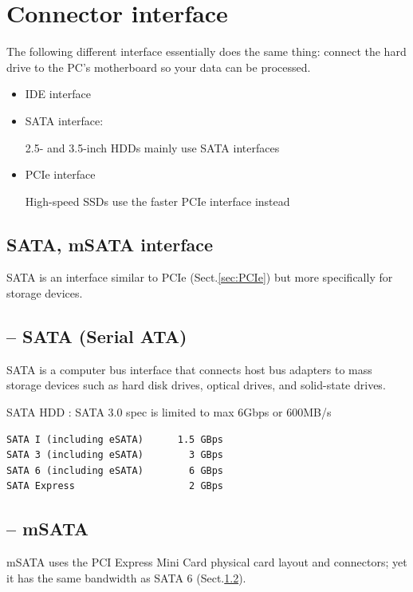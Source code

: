 \section{Connector interface}
\label{sec:connector-interface}

The following different interface essentially does the same thing: connect the
hard drive to the PC's motherboard so your data can be processed.

\begin{itemize}
  \item IDE interface
  
  \item SATA interface:
  
2.5- and 3.5-inch HDDs mainly use SATA interfaces  

    
  \item PCIe interface
  
High-speed SSDs use the faster PCIe interface instead
\end{itemize}


\subsection{SATA, mSATA interface}


SATA is an interface similar to PCIe (Sect.\ref{sec:PCIe}) but more specifically
for storage devices.


\subsection{-- SATA (Serial ATA)}
\label{sec:SATA}

SATA is a computer bus interface that connects host bus adapters to mass storage
devices such as hard disk drives, optical drives, and solid-state drives.

SATA HDD : SATA 3.0 spec is limited to max 6Gbps or  600MB/s

\begin{verbatim}
SATA I (including eSATA)      1.5 GBps
SATA 3 (including eSATA)        3 GBps
SATA 6 (including eSATA)        6 GBps
SATA Express	                2 GBps 
\end{verbatim}

\subsection{-- mSATA}
\label{sec:mSATA}

mSATA uses the PCI Express Mini Card physical card layout and
connectors; yet it has the same bandwidth as SATA 6 (Sect.\ref{sec:SATA}).

